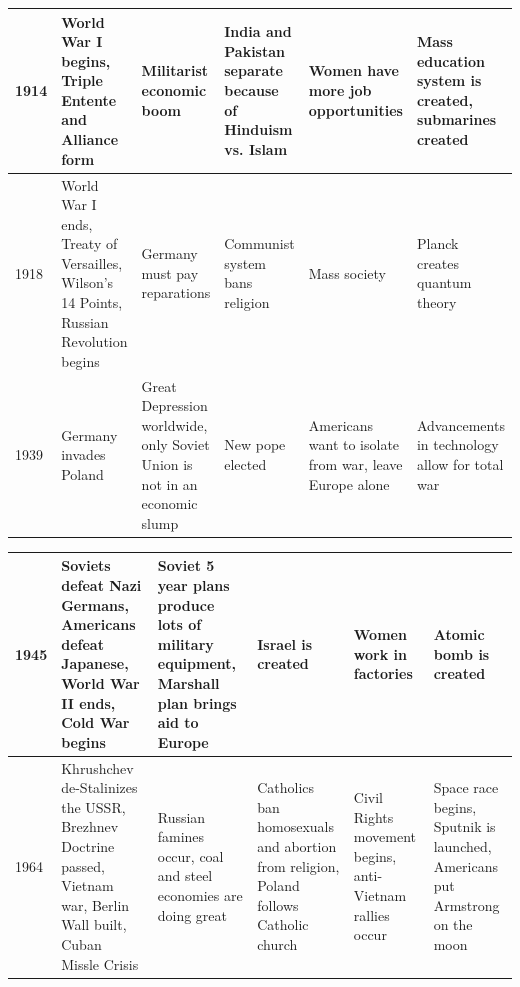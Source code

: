 \documentclass[12pt]{article}
\begin{document}
\begin{enumerate}
\begin{tabular}{|p{}|p{}|p{}|p{}|p{}|p{}|}
\hline
1914 & World War I begins, Triple Entente and Alliance form  & Militarist economic boom  & India and Pakistan separate because of Hinduism vs. Islam  & Women have more job opportunities & Mass education system is created, submarines created \\
\hline
1918 & World War I ends, Treaty of Versailles, Wilson's 14 Points, Russian Revolution begins & Germany must pay reparations  & Communist system bans religion & Mass society &  Planck creates quantum theory \\
\hline
1939 & Germany invades Poland  & Great Depression worldwide, only Soviet Union is not in an economic slump & New pope elected & Americans want to isolate from war, leave Europe alone & Advancements in technology allow for total war  \\
\hline
\end{tabular}
\newpage
\hspace{-40pt} \begin{tabular}{|p{}|p{}|p{}|p{}|p{}|p{}|}
\hline
1945 & Soviets defeat Nazi Germans, Americans defeat Japanese, World War II ends, Cold War begins & Soviet 5 year plans produce lots of military equipment, Marshall plan brings aid to Europe & Israel is created & Women work in factories  & Atomic bomb is created  \\
\hline
1964 & Khrushchev de-Stalinizes the USSR, Brezhnev Doctrine passed, Vietnam war, Berlin Wall built, Cuban Missle Crisis & Russian famines occur, coal and steel economies are doing great & Catholics ban homosexuals and abortion from religion, Poland follows Catholic church & Civil Rights movement begins, anti-Vietnam rallies occur & Space race begins, Sputnik is launched, Americans put Armstrong on the moon \\
\hline



\end{tabular}

\end{enumerate}
\end{document}
